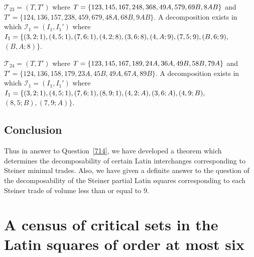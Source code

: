 \documentclass[12pt]{report}
\renewcommand{\baselinestretch}{1.5}
\begin{document}
 ${\mathcal T}_{23}=(T,T')$ 
where $T=\{1 2 3,1 4 5,1 6 7,2 4 8,3 6 8,4 9 A,5 7 9,
6 9 B,\break 8 A B\}$ 
and $T'=\{1 2 4,1 3 6,1 5 7,2 3 8,4 5 9,6 7 9,4 8 A,6 8 B,9 A B\}$.
A decomposition exists in which
$\mathcal{I}_1 = (I_1,I_1')$ where 
$I_1=\{(3, 2; 1),(4, 5; 1),
(7, 6; 1),(4, 2; 8),(3, 6; 8),\break (4, A; 9),
 (7, 5; 9),(B, 6; 9),$ $(B, A; 8)\}$.

 ${\mathcal T}_{24}=(T,T')$ 
where $T=\{1 2 3,1 4 5,1 6 7,1 8 9,2 4 A,3 6 A,4 9 B,\break
5 8 B,7 9 A\}$ 
and $T'=\{1 2 4,1 3 6,1 5 8,1 7 9,2 3 A,4 5 B,4 9 A,6 7 A,8 9 B\}$.
A decomposition exists in which
$\mathcal{I}_1 = (I_1,I_1')$ where 
$I_1=\{(3, 2; 1),(4, 5; 1),
(7, 6; 1),(8, 9; 1),(4, 2; A),\break (3, 6; A),
(4, 9; B),$ 
$(8, 5; B),
(7, 9; A)\}$.

\section{Conclusion}
Thus in answer to Question~\ref{714}, we have developed
a theorem which determines the decomposability of certain Latin
interchanges corresponding to Steiner minimal trades.  Also, we have given
a definite answer to the question of the decomposability of the Steiner
partial Latin squares corresponding to each Steiner trade of volume 
less than or equal to 9. 

%

%
%





\chapter{A census of critical sets in the Latin squares of order at most six}\label{ch8}
\end{document}
